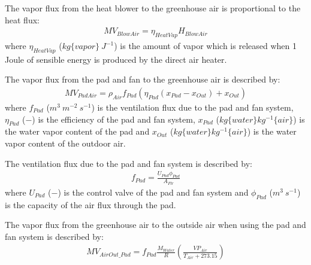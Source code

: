 \documentclass[a4paper]{article}
\numberwithin{equation}{section}
\begin{document}
The vapor flux from the heat blower to the greenhouse air is proportional to the heat flux:
\begin{align}
  MV_{BlowAir} = \eta_{HeatVap} H_{BlowAir}
\end{align}
where \( \eta_{HeatVap} \) (\( kg\{vapor\}\ J^{-1} \)) is the amount of vapor which is released when 1 Joule of sensible energy is produced by the direct air heater.

The vapor flux from the pad and fan to the greenhouse air is described by:
\begin{align}
  MV_{PadAir} = \rho_{Air} f_{Pad} (\eta_{Pad} (x_{Pad} - x_{Out}) + x_{Out})
\end{align}
where \( f_{Pad} \) (\( m^3\ m^{-2}\ s^{-1} \)) is the ventilation flux due to the pad and fan system, \( \eta_{Pad} \) (\( - \)) is the efficiency of the pad and fan system, \( x_{Pad} \) (\( kg\{water\} kg^{-1}\{air\} \)) is the water vapor content of the pad and \( x_{Out} \) (\( kg\{water\} kg^{-1}\{air\} \)) is the water vapor content of the outdoor air.

The ventilation flux due to the pad and fan system is described by:
\begin{align}
  f_{Pad} = \frac{U_{Pad} \phi_{Pad}}{A_{Flr}}
\end{align}
where \( U_{Pad} \) (\( - \)) is the control valve of the pad and fan system and \( \phi_{Pad} \) (\( m^3\ s^{-1} \)) is the capacity of the air flux through the pad.

The vapor flux from the greenhouse air to the outside air when using the pad and fan system is described by:
\begin{align}
  MV_{AirOut\_Pad} = f_{Pad} \frac{M_{Water}}{R} \left(\frac{VP_{Air}}{T_{Air} + 273.15}\right)
\end{align}
\end{document}
